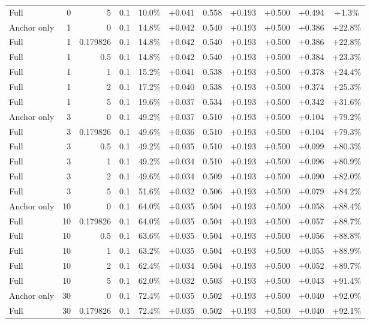 \begin{table}[htbp]
\begin{tabular}{lrrrccccccc}
Full & 0 & 5 & 0.1 & 10.0\% & +0.041 & 0.558 & +0.193 & +0.500 & +0.494 & +1.3\% \\
Anchor only & 1 & 0 & 0.1 & 14.8\% & +0.042 & 0.540 & +0.193 & +0.500 & +0.386 & +22.8\% \\
Full & 1 & 0.179826 & 0.1 & 14.8\% & +0.042 & 0.540 & +0.193 & +0.500 & +0.386 & +22.8\% \\
Full & 1 & 0.5 & 0.1 & 14.8\% & +0.042 & 0.540 & +0.193 & +0.500 & +0.384 & +23.3\% \\
Full & 1 & 1 & 0.1 & 15.2\% & +0.041 & 0.538 & +0.193 & +0.500 & +0.378 & +24.4\% \\
Full & 1 & 2 & 0.1 & 17.2\% & +0.040 & 0.538 & +0.193 & +0.500 & +0.374 & +25.3\% \\
Full & 1 & 5 & 0.1 & 19.6\% & +0.037 & 0.534 & +0.193 & +0.500 & +0.342 & +31.6\% \\
Anchor only & 3 & 0 & 0.1 & 49.2\% & +0.037 & 0.510 & +0.193 & +0.500 & +0.104 & +79.2\% \\
Full & 3 & 0.179826 & 0.1 & 49.6\% & +0.036 & 0.510 & +0.193 & +0.500 & +0.104 & +79.3\% \\
Full & 3 & 0.5 & 0.1 & 49.2\% & +0.035 & 0.510 & +0.193 & +0.500 & +0.099 & +80.3\% \\
Full & 3 & 1 & 0.1 & 49.2\% & +0.034 & 0.510 & +0.193 & +0.500 & +0.096 & +80.9\% \\
Full & 3 & 2 & 0.1 & 49.6\% & +0.034 & 0.509 & +0.193 & +0.500 & +0.090 & +82.0\% \\
Full & 3 & 5 & 0.1 & 51.6\% & +0.032 & 0.506 & +0.193 & +0.500 & +0.079 & +84.2\% \\
Anchor only & 10 & 0 & 0.1 & 64.0\% & +0.035 & 0.504 & +0.193 & +0.500 & +0.058 & +88.4\% \\
Full & 10 & 0.179826 & 0.1 & 64.0\% & +0.035 & 0.504 & +0.193 & +0.500 & +0.057 & +88.7\% \\
Full & 10 & 0.5 & 0.1 & 63.6\% & +0.035 & 0.504 & +0.193 & +0.500 & +0.056 & +88.8\% \\
Full & 10 & 1 & 0.1 & 63.2\% & +0.035 & 0.504 & +0.193 & +0.500 & +0.055 & +88.9\% \\
Full & 10 & 2 & 0.1 & 62.4\% & +0.034 & 0.504 & +0.193 & +0.500 & +0.052 & +89.7\% \\
Full & 10 & 5 & 0.1 & 62.0\% & +0.032 & 0.503 & +0.193 & +0.500 & +0.043 & +91.4\% \\
Anchor only & 30 & 0 & 0.1 & 72.4\% & +0.035 & 0.502 & +0.193 & +0.500 & +0.040 & +92.0\% \\
Full & 30 & 0.179826 & 0.1 & 72.4\% & +0.035 & 0.502 & +0.193 & +0.500 & +0.040 & +92.1\% \\

\end{tabular}
\end{table}
